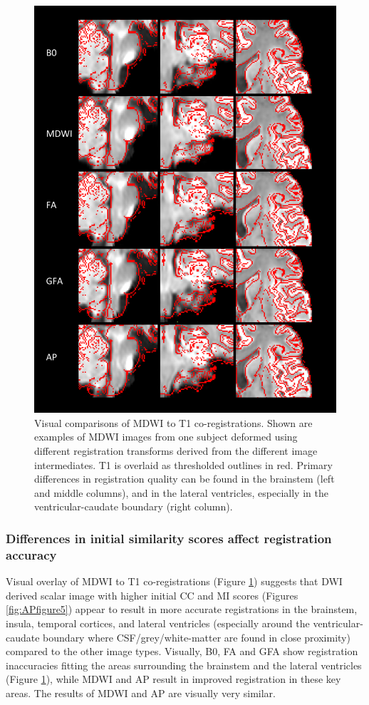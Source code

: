 \begin{figure}[p]
\includegraphics[width=\linewidth]{figure4}
\caption{Visual comparisons of MDWI to T1 co-registrations. 
Shown are examples of MDWI images from one subject deformed using different registration transforms derived from the different image intermediates. 
T1 is overlaid as thresholded outlines in red. 
Primary differences in registration quality can be found in the brainstem (left and middle columns), and in the lateral ventricles, especially in the ventricular-caudate boundary (right column). }
\centering
\label{fig:APfigure4}
\end{figure}

\subsubsection{Differences in initial similarity scores affect registration accuracy}
Visual overlay of MDWI to T1 co-registrations (Figure \ref{fig:APfigure4}) suggests that DWI derived scalar image with higher initial CC and MI scores (Figures \ref{fig:APfigure5}) appear to result in more accurate registrations in the brainstem, insula, temporal cortices, and lateral ventricles (especially around the ventricular-caudate boundary where CSF/grey/white-matter are found in close proximity) compared to the other image types. Visually, B0, FA and GFA show registration inaccuracies fitting the areas surrounding the brainstem and the lateral ventricles (Figure \ref{fig:APfigure4}), while MDWI and AP result in improved registration in these key areas. The results of MDWI and AP are visually very similar.

